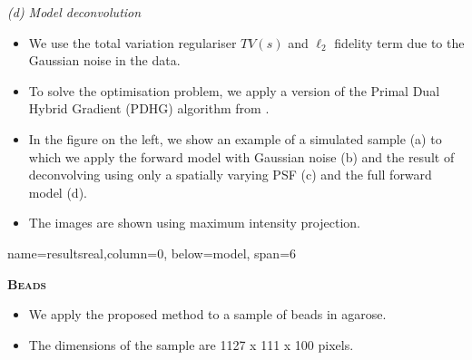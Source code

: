 \documentclass[a0paper,portrait,fontscale=0.35]{baposter}
\newcommand{\mycaption}[1]{
  {
    \smaller
    \emph{#1}
  }
}
\theoremstyle{plain}
\theoremstyle{plain}
\theoremstyle{definition}
\theoremstyle{plain}
\theoremstyle{definition}
\begin{document}
\begin{poster}
{\begin{minipage}[t]{0.55\textwidth}
\begin{minipage}[t]{0.49\textwidth}
        \vspace{0.3em}
        \mycaption{
          (d) Model deconvolution
        }
      \end{minipage}
    \end{minipage}
    \hspace{-0.5em}
    \begin{minipage}[t]{0.45\textwidth}
      \begin{itemize}
        \item We use the total variation regulariser $TV(s)$
          and $\ell_2$ fidelity term due to the Gaussian
          noise in the data. 

        \item To solve the optimisation problem, we apply a version
          of the Primal Dual Hybrid Gradient (PDHG) 
          algorithm from \cite{Boulanger2018,Condat2013}.

        \item In the figure on the left, we show an example of a simulated sample (a) 
          to which we apply the forward model with Gaussian noise (b)
          and the result of deconvolving using only a spatially varying
          PSF (c) and the full forward model (d). 

        \item The images are shown 
          using maximum intensity projection.
      \end{itemize}
    \end{minipage}
}

{name=resultsreal,column=0, below=model, span=6}{
  \begin{minipage}[t]{0.51\textwidth} 
    \begin{center}
      \larger
      \textbf{\textsc{Beads}}
    \end{center}

   \hspace{-2em}
    \begin{minipage}[t]{0.49\textwidth}
      \begin{itemize}
        \item We apply the proposed method to a sample of 
          beads in agarose.
        \item The dimensions of the sample are 1127 x 111 x 100 pixels.


\end{itemize}
\end{minipage}
\end{minipage}}
\end{poster}
\end{document}

